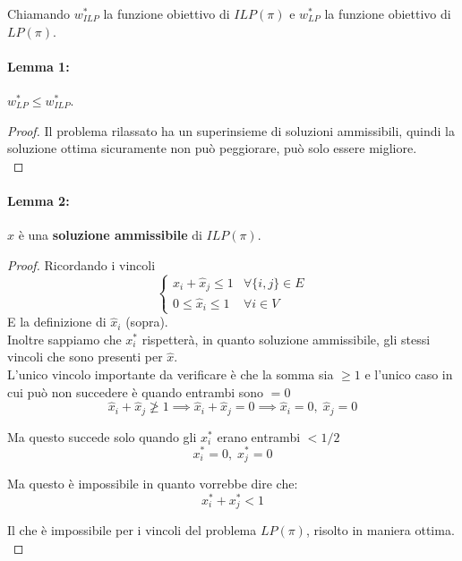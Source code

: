 \documentclass[11pt]{article}
\begin{document}
	Chiamando $w^\ast_{ILP}$ la funzione obiettivo di $ILP(\pi)$ e $w^\ast_{LP}$ la funzione obiettivo di $LP(\pi)$.\\
	
	\paragraph{Lemma 1:} $w^\ast_{LP} \leq w^\ast_{ILP}$.\\
	
	\begin{proof}
		Il problema rilassato ha un superinsieme di soluzioni ammissibili, quindi la soluzione ottima sicuramente non può peggiorare, può solo essere migliore.\\
	\end{proof}
	
	\paragraph{Lemma 2:} $\hat{x}$ è una \textbf{soluzione ammissibile} di $ILP(\pi)$.\\
	
	\begin{proof}
		Ricordando i vincoli
		$$\begin{cases}
			\hat{x}_i + \hat{x}_j \leq 1 & \forall \{i,j\} \in E \\
			0 \leq \hat{x}_i \leq 1 & \forall i \in V
		\end{cases}
		$$
		E la definizione di $\hat{x}_i$ (sopra).\\
		
		Inoltre sappiamo che $x^\ast_i$ rispetterà, in quanto soluzione ammissibile, gli stessi vincoli che sono presenti per $\hat{x}$.\\
		
		L'unico vincolo importante da verificare è che la somma sia $\geq 1$ e l'unico caso in cui può non succedere è quando entrambi sono $=0$ 
		$$ \hat{x}_i + \hat{x}_j \ngeq 1 \implies \hat{x}_i + \hat{x}_j = 0 \implies \hat{x}_i = 0, \; \hat{x}_j = 0  $$
		
		Ma questo succede solo quando gli $x_i^\ast$ erano entrambi $< 1/2$
		$$ x_i^\ast = 0, \; x_j^\ast = 0$$
		
		Ma questo è impossibile in quanto vorrebbe dire che:
		$$ x_i^\ast + x_j^\ast < 1 $$
		
		Il che è impossibile per i vincoli del problema $LP(\pi)$, risolto in maniera ottima.\\
	\end{proof}
	
\end{document}
